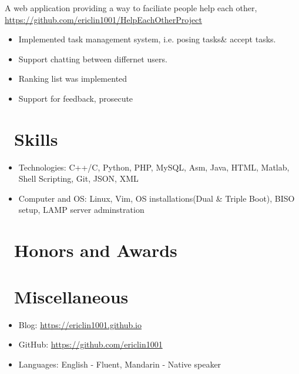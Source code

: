 \documentclass{resume}
\begin{document}
A web application providing a way to faciliate people help each other, \url{https://github.com/ericlin1001/HelpEachOtherProject}
\begin{itemize}
	\item Implemented task management system, i.e. posing tasks\& accept tasks.
	\item Support chatting between differnet users.
	\item Ranking list was implemented
	\item Support for feedback, prosecute
\end{itemize}

\section{\faCogs\ Skills}
\begin{itemize}[parsep=0.5ex]
  \item Technologies: C++/C, Python, PHP, MySQL, Asm, Java, HTML, Matlab, Shell Scripting, Git, JSON, XML
  \item Computer and OS: Linux, Vim, OS installations(Dual \& Triple Boot), BISO setup, LAMP server adminstration
\end{itemize}

\section{\faHeartO\ Honors and Awards}

\section{\faInfo\ Miscellaneous}
\begin{itemize}[parsep=0.5ex]
	\item Blog: \url{https://ericlin1001.github.io}
	\item GitHub: \url{https://github.com/ericlin1001}
  \item Languages: English - Fluent, Mandarin - Native speaker
\end{itemize}

%
%
\end{document}
